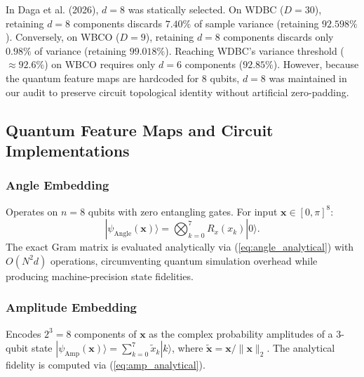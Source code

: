 \documentclass[journal,twocolumn]{IEEEtran}
\begin{document}
In Daga et al. (2026), $d=8$ was statically selected. On WDBC ($D=30$), retaining $d=8$ components discards $7.40\%$ of sample variance (retaining $92.598\%$). Conversely, on WBCO ($D=9$), retaining $d=8$ components discards only $0.98\%$ of variance (retaining $99.018\%$). Reaching WDBC's variance threshold ($\approx 92.6\%$) on WBCO requires only $d=6$ components ($92.85\%$). However, because the quantum feature maps are hardcoded for 8 qubits, $d=8$ was maintained in our audit to preserve circuit topological identity without artificial zero-padding.

\subsection{Quantum Feature Maps and Circuit Implementations}

\subsubsection{Angle Embedding}
Operates on $n=8$ qubits with zero entangling gates. For input $\mathbf{x} \in [0, \pi]^8$:
\begin{equation}
|\psi_{\text{Angle}}(\mathbf{x})\rangle = \bigotimes_{k=0}^7 R_x(x_k)|0\rangle.
\end{equation}
The exact Gram matrix is evaluated analytically via (\ref{eq:angle_analytical}) with $O(N^2 d)$ operations, circumventing quantum simulation overhead while producing machine-precision state fidelities.

\subsubsection{Amplitude Embedding}
Encodes $2^3 = 8$ components of $\mathbf{x}$ as the complex probability amplitudes of a 3-qubit state $|\psi_{\text{Amp}}(\mathbf{x})\rangle = \sum_{k=0}^7 \tilde{x}_k |k\rangle$, where $\tilde{\mathbf{x}} = \mathbf{x} / \|\mathbf{x}\|_2$. The analytical fidelity is computed via (\ref{eq:amp_analytical}).
\end{document}
